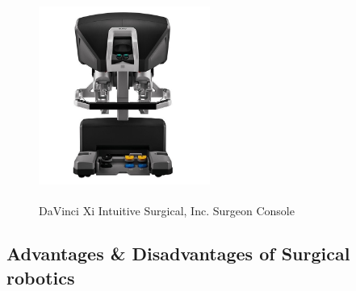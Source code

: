 \begin{center}
\begin{figure}[H]
\centering
\includegraphics[width=0.5\textwidth]{images/intuitive-davinci-console-front-lowres.jpg}\\
\caption[DaVinci Xi \textsuperscript {} Intuitive Surgical, Inc. Surgeon Console]{DaVinci Xi \textsuperscript {} Intuitive Surgical, Inc. Surgeon Console \footnotemark}
\end{figure}
\end{center}


\subsection{Advantages \& Disadvantages of Surgical robotics}

